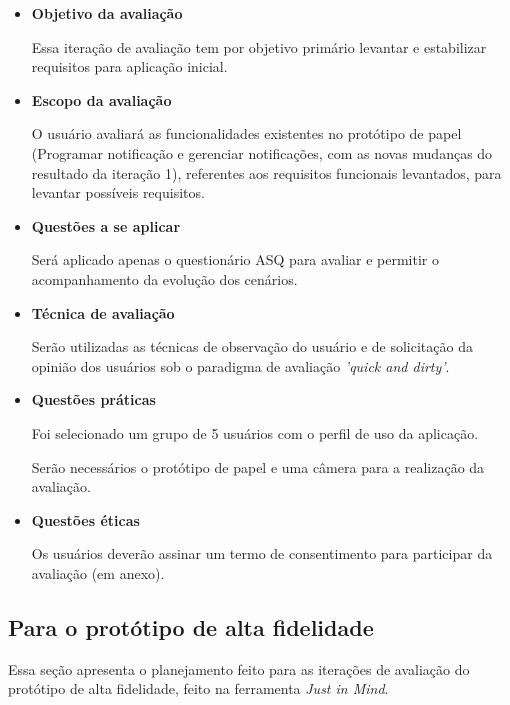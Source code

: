 	  \begin{itemize}
	  
	   \item \textbf{Objetivo da avaliação}
	      
	      \subitem Essa iteração de avaliação tem por objetivo primário levantar e estabilizar
		requisitos para aplicação inicial.
	    
	   \item \textbf{Escopo da avaliação}
	      
	      \subitem 
		O usuário avaliará as funcionalidades existentes no protótipo de papel 
		(Programar notificação e gerenciar notificações, com as novas mudanças do resultado da iteração 1),
		referentes aos requisitos funcionais levantados, para levantar possíveis requisitos.
	      
	   \item \textbf{Questões a se aplicar}
	      
	      \subitem Será aplicado apenas o questionário ASQ para avaliar e permitir o acompanhamento da evolução dos cenários.
	      
	   \item \textbf{Técnica de avaliação}
	      
	      \subitem 
		Serão utilizadas as técnicas de observação do usuário e de solicitação da opinião dos usuários
		sob o paradigma de avaliação \textit{'quick and dirty'}.
	      
	   \item \textbf{Questões práticas}
	      
	      \subitem Foi selecionado um grupo de 5 usuários com o perfil de uso da aplicação.
	      
	      \subitem Serão necessários o protótipo de papel e uma câmera para a realização da avaliação.
	      
	   \item \textbf{Questões éticas}
	      
	      \subitem 
		Os usuários deverão assinar um termo de consentimento para participar da avaliação (em anexo).
	   
	  \end{itemize}
      
      \subsection{Para o protótipo de alta fidelidade}
	
	Essa seção apresenta o planejamento feito para as iterações de avaliação do protótipo de alta fidelidade, feito na
	ferramenta \textit{Just in Mind}.
	

